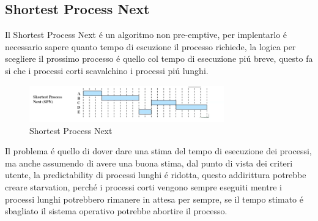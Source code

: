     \subsection{Shortest Process Next}
    Il Shortest Process Next é un algoritmo non pre-emptive, per implentarlo é necessario sapere quanto tempo di escuzione il
    processo richiede, la logica per scegliere il prossimo processo é quello col tempo di esecuzione piú breve,
    questo fa si che i processi corti scavalchino i processi piú lunghi.
    \begin{figure}[H]
        \centering
        \includegraphics[width=0.75\textwidth]{immagini/SPN}
        \caption{Shortest Process Next}
    \end{figure}
    Il problema é quello di dover dare una stima del tempo di esecuzione dei processi,
    ma anche assumendo di avere una buona stima, dal punto di vista dei criteri utente, la predictability di processi
    lunghi é ridotta, questo addirittura potrebbe creare starvation, perché i processi corti vengono sempre eseguiti
    mentre i processi lunghi potrebbero rimanere in attesa per sempre, se il tempo stimato é sbagliato il sistema operativo
    potrebbe abortire il processo.
